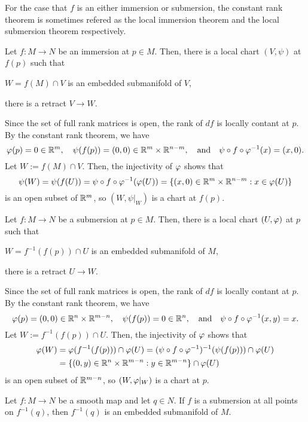 \documentclass{../note}
\begin{document}
For the case that $f$ is an either immersion or submersion, the constant rank theorem is sometimes refered as the local immersion theorem and the local submersion theorem respectively.

\begin{cor}
Let $f:M\to N$ be an immersion at $p\in M$.
Then, there is a local chart $(V,\psi)$ at $f(p)$ such that
\begin{parts}
\item $W=f(M)\cap V$ is an embedded submanifold of $V$,
\item there is a retract $V\to W$.
\end{parts}
\end{cor}
\begin{pf}
Since the set of full rank matrices is open, the rank of $df$ is locally contant at $p$.
By the constant rank theorem, we have
\[\varphi(p)=0\in\mathbb{R}^m,\quad\psi(f(p))=(0,0)\in\mathbb{R}^m\times\mathbb{R}^{n-m},\quad\text{and}\quad\psi\circ f\circ\varphi^{-1}(x)=(x,0).\]
Let $W:=f(M)\cap V$.
Then, the injectivity of $\varphi$ shows that
\[\psi(W)=\psi(f(U))=\psi\circ f\circ\varphi^{-1}(\varphi(U))=\{(x,0)\in\mathbb{R}^m\times\mathbb{R}^{n-m}:x\in\varphi(U)\}\]
is an open subset of $\mathbb{R}^m$, so $(W,\psi|_W)$ is a chart at $f(p)$.
\end{pf}

\begin{cor}
Let $f:M\to N$ be a submersion at $p\in M$.
Then, there is a local chart $(U,\varphi)$ at $p$ such that
\begin{parts}
\item $W=f^{-1}(f(p))\cap U$ is an embedded submanifold of $M$,
\item there is a retract $U\to W$.
\end{parts}
\end{cor}
\begin{pf}
Since the set of full rank matrices is open, the rank of $df$ is locally contant at $p$.
By the constant rank theorem, we have
\[\varphi(p)=(0,0)\in\mathbb{R}^n\times\mathbb{R}^{m-n},\quad\psi(f(p))=0\in\mathbb{R}^n,\quad\text{and}\quad\psi\circ f\circ\varphi^{-1}(x,y)=x.\]
Let $W:=f^{-1}(f(p))\cap U$.
Then, the injectivity of $\varphi$ shows that
\begin{align*}
\varphi(W)&=\varphi(f^{-1}(f(p)))\cap\varphi(U)=(\psi\circ f\circ\varphi^{-1})^{-1}(\psi(f(p)))\cap\varphi(U)\\
&=\{(0,y)\in\mathbb{R}^n\times\mathbb{R}^{m-n}:y\in\mathbb{R}^{m-n}\}\cap\varphi(U)
\end{align*}
is an open subset of $\mathbb{R}^{m-n}$, so $(W,\varphi|_W)$ is a chart at $p$.
\end{pf}
\begin{cor}
Let $f:M\to N$ be a smooth map and let $q\in N$.
If $f$ is a submersion at all points on $f^{-1}(q)$, then $f^{-1}(q)$ is an embedded submanifold of $M$.
\end{cor}
\end{document}
